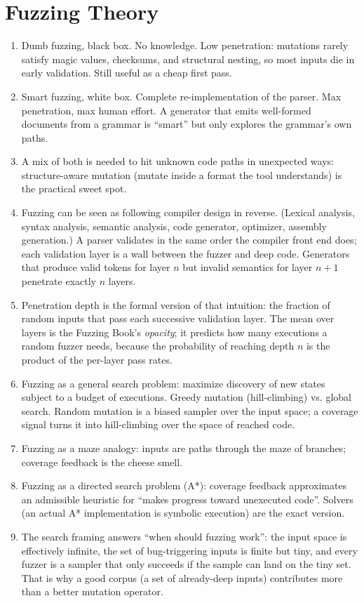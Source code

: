 \documentclass[12pt]{Training}
\begin{document}
\section*{Fuzzing Theory}
\begin{enumerate}
	\item Dumb fuzzing, black box. No knowledge. Low penetration: mutations rarely satisfy magic values, checksums, and structural nesting, so most inputs die in early validation. Still useful as a cheap first pass.
	\item Smart fuzzing, white box. Complete re-implementation of the parser. Max penetration, max human effort. A generator that emits well-formed documents from a grammar is ``smart'' but only explores the grammar's own paths.
    \item A mix of both is needed to hit unknown code paths in unexpected ways: structure-aware mutation (mutate inside a format the tool understands) is the practical sweet spot.
    \item Fuzzing can be seen as following compiler design in reverse. (Lexical analysis, syntax analysis, semantic analysis, code generator, optimizer, assembly generation.) A parser validates in the same order the compiler front end does; each validation layer is a wall between the fuzzer and deep code. Generators that produce valid tokens for layer $n$ but invalid semantics for layer $n{+}1$ penetrate exactly $n$ layers.
	\item Penetration depth is the formal version of that intuition: the fraction of random inputs that pass each successive validation layer. The mean over layers is the Fuzzing Book's \emph{opacity}; it predicts how many executions a random fuzzer needs, because the probability of reaching depth $n$ is the product of the per-layer pass rates.
	\item Fuzzing as a general search problem: maximize discovery of new states subject to a budget of executions. Greedy mutation (hill-climbing) vs. global search. Random mutation is a biased sampler over the input space; a coverage signal turns it into hill-climbing over the space of reached code.
	\item Fuzzing as a maze analogy: inputs are paths through the maze of branches; coverage feedback is the cheese smell.
	\item Fuzzing as a directed search problem (A*): coverage feedback approximates an admissible heuristic for ``makes progress toward unexecuted code''. Solvers (an actual A* implementation is symbolic execution) are the exact version.
	\item The search framing answers ``when should fuzzing work'': the input space is effectively infinite, the set of bug-triggering inputs is finite but tiny, and every fuzzer is a sampler that only succeeds if the sample can land on the tiny set. That is why a good corpus (a set of already-deep inputs) contributes more than a better mutation operator.
\end{enumerate}
\end{document}
